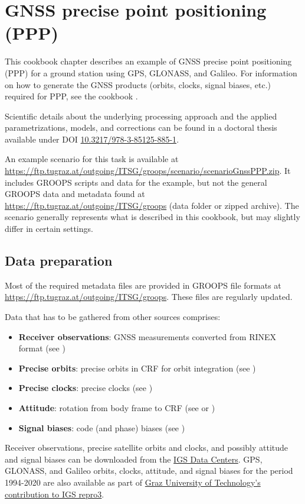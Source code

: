 \section{GNSS precise point positioning (PPP)}\label{cookbook.gnssPpp}
This cookbook chapter describes an example of GNSS precise point positioning (PPP) for a ground station using GPS, GLONASS, and Galileo.
For information on how to generate the GNSS products (orbits, clocks, signal biases, etc.) required for PPP,
see the cookbook .

Scientific details about the underlying processing approach and the applied parametrizations, models, and corrections
can be found in a doctoral thesis available under DOI \href{https://doi.org/10.3217/978-3-85125-885-1}{10.3217/978-3-85125-885-1}.

An example scenario for this task is available at \url{https://ftp.tugraz.at/outgoing/ITSG/groops/scenario/scenarioGnssPPP.zip}.
It includes GROOPS scripts and data for the example, but not the general GROOPS data and metadata found at \url{https://ftp.tugraz.at/outgoing/ITSG/groops} (data folder or zipped archive).
The scenario generally represents what is described in this cookbook, but may slightly differ in certain settings.

\subsection{Data preparation}\label{cookbook.gnssPpp:metadata}
Most of the required metadata files are provided in GROOPS file formats at \url{https://ftp.tugraz.at/outgoing/ITSG/groops}.
These files are regularly updated.

Data that has to be gathered from other sources comprises:
\begin{itemize}
  \item \textbf{Receiver observations}: GNSS measurements converted from RINEX format (see )
  \item \textbf{Precise orbits}: precise orbits in CRF for orbit integration (see )
  \item \textbf{Precise clocks}: precise clocks (see )
  \item \textbf{Attitude}: rotation from body frame to CRF (see  or )
  \item \textbf{Signal biases}: code (and phase) biases (see )
\end{itemize}
Receiver observations, precise satellite orbits and clocks, and possibly attitude and signal biases can be downloaded from the
\href{https://igs.org/data-products-overview/}{IGS Data Centers}.
GPS, GLONASS, and Galileo orbits, clocks, attitude, and signal biases for the period 1994-2020 are also available as part of
\href{https://doi.org/10.3217/dataset-4528-0723-0867}{Graz University of Technology's contribution to IGS repro3}.

